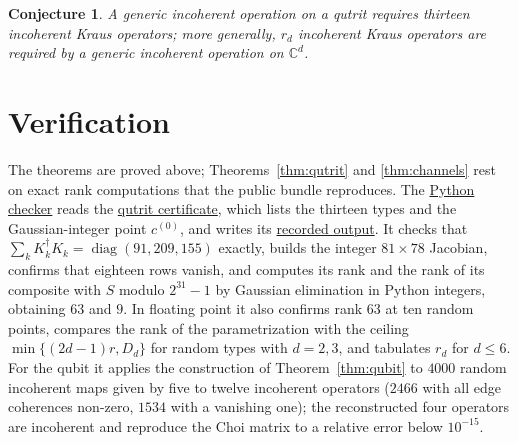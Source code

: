 \documentclass[11pt,a4paper]{article}
\newtheorem{conjecture}[theorem]{Conjecture}
\theoremstyle{definition}
\theoremstyle{plain}
\newcommand{\C}{\mathbb{C}}
\begin{document}
\begin{conjecture}\label{conj:channels}
A generic incoherent operation on a qutrit requires thirteen incoherent Kraus
operators; more generally, $r_d$ incoherent Kraus operators are required by a
generic incoherent operation on $\C^d$.
\end{conjecture}

\section{Verification}\label{sec:verification}
The theorems are proved above; Theorems~\ref{thm:qutrit} and
\ref{thm:channels} rest on exact rank computations that the public bundle
reproduces. The
\href{https://github.com/jpbruneton/open_quantum_problems/blob/main/research/entries/incoherent-kraus-operators/checks/verify_incoherent_kraus.py}{Python checker}
reads the
\href{https://github.com/jpbruneton/open_quantum_problems/blob/main/research/entries/incoherent-kraus-operators/data/qutrit_certificate.json}{qutrit certificate},
which lists the thirteen types and the Gaussian-integer point $c^{(0)}$,
and writes its
\href{https://github.com/jpbruneton/open_quantum_problems/blob/main/research/entries/incoherent-kraus-operators/data/verification.json}{recorded output}.
It checks that $\sum_kK_k^\dagger K_k=\operatorname{diag}(91,209,155)$
exactly, builds the integer $81\times78$ Jacobian, confirms that eighteen
rows vanish, and computes its rank and the rank of its composite with $S$
modulo $2^{31}-1$ by Gaussian elimination in Python integers, obtaining $63$
and $9$. In floating point it also confirms rank $63$ at ten random points,
compares the rank of the parametrization with the ceiling
$\min\{(2d-1)r,D_d\}$ for random types with $d=2,3$, and tabulates $r_d$ for
$d\le6$. For the qubit it applies the construction of
Theorem~\ref{thm:qubit} to $4000$ random incoherent maps given by five to
twelve incoherent operators ($2466$ with all edge coherences non-zero,
$1534$ with a vanishing one); the reconstructed four operators are
incoherent and reproduce the Choi matrix to a relative error below
$10^{-15}$.
\end{document}
